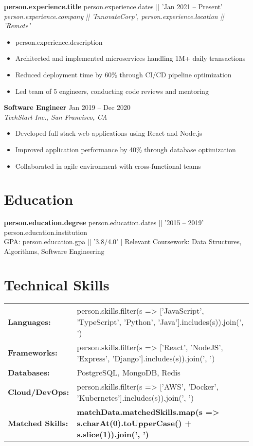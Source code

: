 \documentclass[10pt,a4paper]{article}
\begin{document}
\noindent
\textbf{{{person.experience.title}}} \hfill {{person.experience.dates || 'Jan 2021 -- Present'}}\\
\textit{{{person.experience.company || 'InnovateCorp'}}, {{person.experience.location || 'Remote'}}}
\begin{itemize}[leftmargin=*, topsep=0pt, itemsep=2pt]
    \item {{person.experience.description}}
    \item Architected and implemented microservices handling 1M+ daily transactions
    \item Reduced deployment time by 60\% through CI/CD pipeline optimization
    \item Led team of 5 engineers, conducting code reviews and mentoring
\end{itemize}

\vspace{0.5em}
\noindent
\textbf{Software Engineer} \hfill Jan 2019 -- Dec 2020\\
\textit{TechStart Inc., San Francisco, CA}
\begin{itemize}[leftmargin=*, topsep=0pt, itemsep=2pt]
    \item Developed full-stack web applications using React and Node.js
    \item Improved application performance by 40\% through database optimization
    \item Collaborated in agile environment with cross-functional teams
\end{itemize}

\section{Education}
\noindent
\textbf{{{person.education.degree}}} \hfill {{person.education.dates || '2015 -- 2019'}}\\
{{person.education.institution}}\\
GPA: {{person.education.gpa || '3.8/4.0'}} | Relevant Coursework: Data Structures, Algorithms, Software Engineering

\section{Technical Skills}
\begin{tabularx}{\textwidth}{@{}l X@{}}
    \textbf{Languages:} & {{person.skills.filter(s => ['JavaScript', 'TypeScript', 'Python', 'Java'].includes(s)).join(', ')}} \\
    \textbf{Frameworks:} & {{person.skills.filter(s => ['React', 'NodeJS', 'Express', 'Django'].includes(s)).join(', ')}} \\
    \textbf{Databases:} & PostgreSQL, MongoDB, Redis \\
    \textbf{Cloud/DevOps:} & {{person.skills.filter(s => ['AWS', 'Docker', 'Kubernetes'].includes(s)).join(', ')}} \\
    \textbf{Matched Skills:} & \textbf{{{matchData.matchedSkills.map(s => s.charAt(0).toUpperCase() + s.slice(1)).join(', ')}}}
\end{tabularx}
\end{document}
